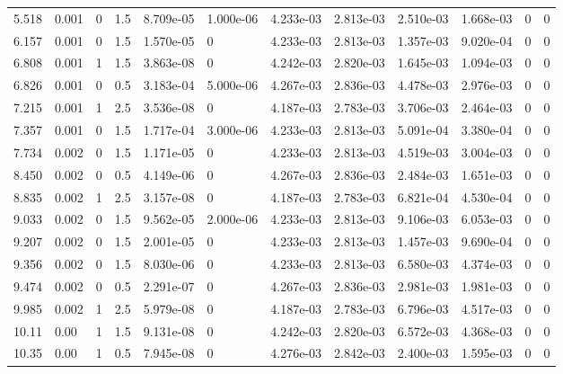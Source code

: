 \documentclass[preview]{standalone}
\begin{document}
{{\begin{tabular}{L{1.2cm}C{1.2cm} C{0.3cm}C{0.5cm} C{1.4cm}C{1.4cm} C{1.4cm}C{1.4cm} C{1.6cm}C{1.6cm} C{1.6cm}C{1.6cm}}
  5.518  &  0.001  & 0     & 1.5 &  8.709e-05  & 1.000e-06  &  4.233e-03&   2.813e-03& 2.510e-03 & 1.668e-03   &  0 & 0  \\ 
  6.157  &  0.001  & 0     & 1.5 &  1.570e-05  & 0  &  4.233e-03&   2.813e-03& 1.357e-03 & 9.020e-04   &  0 & 0  \\ 
  6.808  &  0.001  & 1     & 1.5 &  3.863e-08  & 0  &  4.242e-03&   2.820e-03& 1.645e-03 & 1.094e-03   &  0 & 0  \\ 
  6.826  &  0.001  & 0     & 0.5 &  3.183e-04  & 5.000e-06  &  4.267e-03&   2.836e-03& 4.478e-03 & 2.976e-03   &  0 & 0  \\ 
  7.215  &  0.001  & 1     & 2.5 &  3.536e-08  & 0  &  4.187e-03&   2.783e-03& 3.706e-03 & 2.464e-03   &  0 & 0  \\ 
  7.357  &  0.001  & 0     & 1.5 &  1.717e-04  & 3.000e-06  &  4.233e-03&   2.813e-03& 5.091e-04 & 3.380e-04   &  0 & 0  \\ 
  7.734  &  0.002  & 0     & 1.5 &  1.171e-05  & 0  &  4.233e-03&   2.813e-03& 4.519e-03 & 3.004e-03   &  0 & 0  \\ 
  8.450  &  0.002  & 0     & 0.5 &  4.149e-06  & 0  &  4.267e-03&   2.836e-03& 2.484e-03 & 1.651e-03   &  0 & 0  \\ 
  8.835  &  0.002  & 1     & 2.5 &  3.157e-08  & 0  &  4.187e-03&   2.783e-03& 6.821e-04 & 4.530e-04   &  0 & 0  \\ 
  9.033  &  0.002  & 0     & 1.5 &  9.562e-05  & 2.000e-06  &  4.233e-03&   2.813e-03& 9.106e-03 & 6.053e-03   &  0 & 0  \\ 
  9.207  &  0.002  & 0     & 1.5 &  2.001e-05  & 0  &  4.233e-03&   2.813e-03& 1.457e-03 & 9.690e-04   &  0 & 0  \\ 
  9.356  &  0.002  & 0     & 1.5 &  8.030e-06  & 0  &  4.233e-03&   2.813e-03& 6.580e-03 & 4.374e-03   &  0 & 0  \\ 
  9.474  &  0.002  & 0     & 0.5 &  2.291e-07  & 0  &  4.267e-03&   2.836e-03& 2.981e-03 & 1.981e-03   &  0 & 0  \\ 
  9.985  &  0.002  & 1     & 2.5 &  5.979e-08  & 0  &  4.187e-03&   2.783e-03& 6.796e-03 & 4.517e-03   &  0 & 0  \\ 
  10.11  &  0.00  & 1     & 1.5 &  9.131e-08  & 0  &  4.242e-03&   2.820e-03& 6.572e-03 & 4.368e-03   &  0 & 0  \\ 
  10.35  &  0.00  & 1     & 0.5 &  7.945e-08  & 0  &  4.276e-03&   2.842e-03& 2.400e-03 & 1.595e-03   &  0 & 0  \\ 
\hline 
\end{tabular} 

}}
\end{document}
